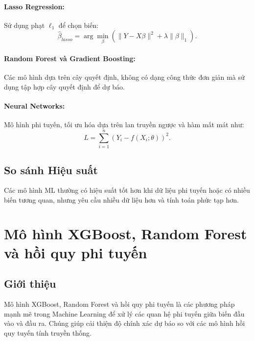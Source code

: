 \paragraph{Lasso Regression:} Sử dụng phạt $\ell_1$ để chọn biến:
\begin{equation}
    \hat{\beta}_{lasso} = \arg\min_\beta \left( \|Y - X\beta\|^2 + \lambda \|\beta\|_1 \right).
\end{equation}

\paragraph{Random Forest và Gradient Boosting:} Các mô hình dựa trên cây quyết định, không có dạng công thức đơn giản mà sử dụng tập hợp cây quyết định để dự báo.

\paragraph{Neural Networks:} Mô hình phi tuyến, tối ưu hóa dựa trên lan truyền ngược và hàm mất mát như:
\begin{equation}
    L = \sum_{i=1}^{n} (Y_i - f(X_i; \theta))^2.
\end{equation}

\subsection{So sánh Hiệu suất}
Các mô hình ML thường có hiệu suất tốt hơn khi dữ liệu phi tuyến hoặc có nhiều biến tương quan, nhưng yêu cầu nhiều dữ liệu hơn và tính toán phức tạp hơn.





\section{Mô hình XGBoost, Random Forest và hồi quy phi tuyến}
\subsection{Giới thiệu}
Mô hình XGBoost, Random Forest và hồi quy phi tuyến là các phương pháp mạnh mẽ trong Machine Learning để xử lý các quan hệ phi tuyến giữa biến đầu vào và đầu ra. Chúng giúp cải thiện độ chính xác dự báo so với các mô hình hồi quy tuyến tính truyền thống.

